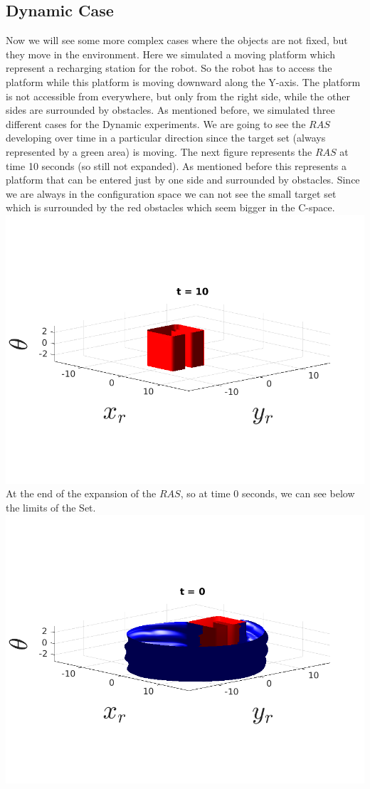 \subsection{Dynamic Case}
    Now we will see some more complex cases where the objects are not fixed, but they move in the environment. Here we simulated a moving platform which represent a recharging station for the robot. So the robot has to access the platform while this platform is moving downward along the Y-axis. The platform is not accessible from everywhere, but only from the right side, while the other sides are surrounded by obstacles. As mentioned before, we simulated three different cases for the Dynamic experiments. We are going to see the $RAS$ developing over time in a particular direction since the target set (always represented by a green area) is moving. The next figure represents the $RAS$ at time 10 seconds (so still not expanded). As mentioned before this represents a platform that can be entered just by one side and surrounded by obstacles. Since we are always in the configuration space we can not see the small target set which is surrounded by the red obstacles which seem bigger in the C-space.
    \includegraphics[scale=0.6]{figures/dynamicRAS1.png}
    At the end of the expansion of the $RAS$, so at time 0 seconds, we can see below the limits of the Set.
    \includegraphics[scale=0.6]{figures/dynamicRAS2.png}
